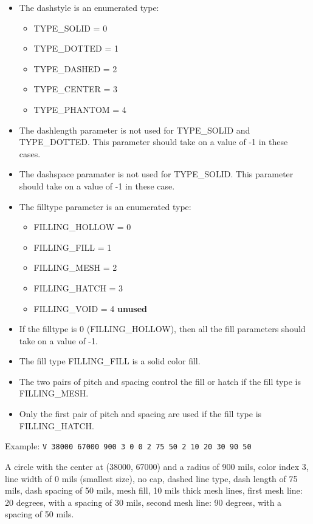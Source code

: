 \documentclass{article}
\begin{document}
\begin{itemize}
\item The dashstyle is an enumerated type: 
\begin{itemize}
	\item TYPE\_SOLID = 0 
	\item TYPE\_DOTTED = 1
	\item TYPE\_DASHED = 2
	\item TYPE\_CENTER = 3
        \item TYPE\_PHANTOM = 4
\end{itemize}
\item The dashlength parameter is not used for TYPE\_SOLID and TYPE\_DOTTED.  
      This parameter should take on a value of -1 in these cases.
\item The dashspace paramater is not used for TYPE\_SOLID.
      This parameter should take on a value of -1 in these case.
\item The filltype parameter is an enumerated type: 
\begin{itemize}
	\item FILLING\_HOLLOW = 0
	\item FILLING\_FILL = 1
	\item FILLING\_MESH = 2 
	\item FILLING\_HATCH = 3
        \item FILLING\_VOID = 4  {\bf unused}
\end{itemize}
\item If the filltype is 0 (FILLING\_HOLLOW), then all the fill parameters 
      should take on a value of -1.
\item The fill type FILLING\_FILL is a solid color fill.
\item The two pairs of pitch and spacing control the fill or hatch if the
      fill type is FILLING\_MESH. 
\item Only the first pair of pitch and spacing are used if the fill type is
      FILLING\_HATCH.
\end{itemize}

Example:\newline
{\tt V 38000 67000 900 3 0 0 2 75 50 2 10 20 30 90 50}

A circle with the center at (38000, 67000) and a radius of 900 mils, color 
index 3, line width of 0 mils (smallest size), no cap, dashed line 
type, dash length of 75 mils, dash spacing of 50 mils, mesh fill, 10 mils
thick mesh lines, first mesh line: 20 degrees, with a spacing of 30 mils, 
second mesh line: 90 degrees, with a spacing of 50 mils.
\end{document}
